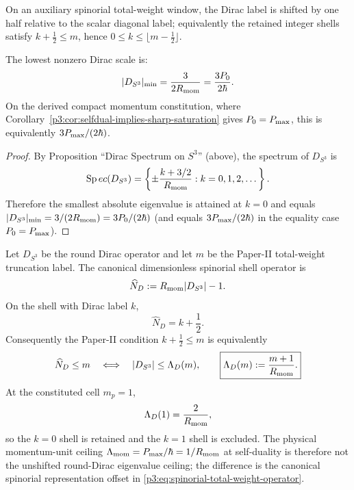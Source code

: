 \documentclass[12pt,a4paper]{article}
\begin{document}
On an auxiliary spinorial total-weight window, the Dirac label is shifted by one half relative to the scalar diagonal label; equivalently the retained integer shells satisfy \(k+\frac12\le m\), hence \(0\le k\le\lfloor m-\tfrac12\rfloor\).

\begin{corollary}
\label{paper3b:corollary:atlas-lowest-dirac-spectral-gap-b395ce9}

The lowest nonzero Dirac scale is:
\begin{equation}
|D_{S^3}|_{\min} = \frac{3}{2R_{\mathrm{mom}}} = \frac{3P_{0}}{2\hbar}.
\end{equation}
On the derived compact momentum constitution, where Corollary~\ref{p3:cor:selfdual-implies-sharp-saturation} gives \(P_{0}=P_{\mathrm{max}}\), this is equivalently \(3P_{\mathrm{max}}/(2\hbar)\).
\end{corollary}
\begin{proof}
By Proposition ``Dirac Spectrum on $S^3$'' (above), the spectrum of $D_{S^3}$ is
\[
\operatorname{Sp}ec(D_{S^3})=\left\{\pm\frac{k+3/2}{R_{\mathrm{mom}}}:k=0,1,2,\dots\right\}.
\]
Therefore the smallest absolute eigenvalue is attained at $k=0$ and equals
$|D_{S^3}|_{\min}=3/(2R_{\mathrm{mom}})=3P_{0}/(2\hbar)$ (and equals $3P_{\mathrm{max}}/(2\hbar)$ in the equality case $P_{0}=P_{\mathrm{max}}$).
\end{proof}

\begin{theorem}
\label{p3:thm:spinorial-shell-ceiling-dictionary}
Let \(D_{S^3}\) be the round Dirac operator and let \(m\) be the Paper-II
total-weight truncation label.  The canonical dimensionless spinorial shell
operator is
\begin{equation}
\label{p3:eq:spinorial-total-weight-operator}
        \widehat N_D:=R_{\mathrm{mom}}|D_{S^3}|-1.
\end{equation}
On the shell with Dirac label \(k\),
\[
        \widehat N_D=k+\frac12.
\]
Consequently the Paper-II condition \(k+\frac12\le m\) is equivalently
\begin{equation}
\label{p3:eq:spinorial-shell-ceiling}
        \widehat N_D\le m
        \quad\Longleftrightarrow\quad
        |D_{S^3}|\le\Lambda_D(m),
        \qquad
        \boxed{\Lambda_D(m):=\frac{m+1}{R_{\mathrm{mom}}}.}
\end{equation}
At the constituted cell \(m_p=1\),
\[
        \Lambda_D(1)=\frac2{R_{\mathrm{mom}}},
\]
so the \(k=0\) shell is retained and the \(k=1\) shell is excluded.  The
physical momentum-unit ceiling
\(\Lambda_{\rm mom}=P_{\mathrm{max}}/\hbar=1/R_{\mathrm{mom}}\) at self-duality is therefore not the
unshifted round-Dirac eigenvalue ceiling; the difference is the canonical
spinorial representation offset in \eqref{p3:eq:spinorial-total-weight-operator}.
\end{theorem}
\end{document}
